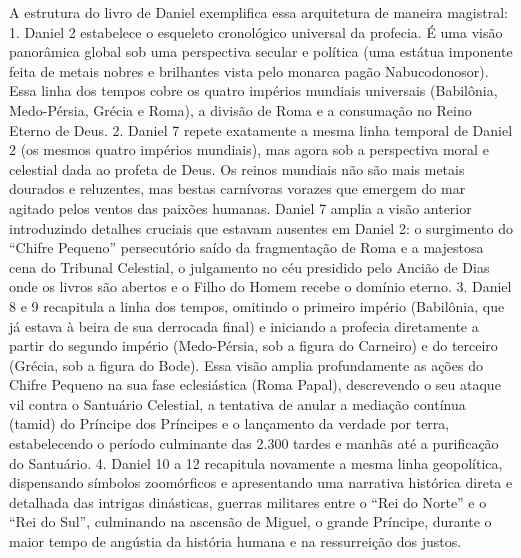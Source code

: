A estrutura do livro de Daniel exemplifica essa arquitetura de maneira magistral:
1. Daniel 2 estabelece o esqueleto cronológico universal da profecia. É uma visão panorâmica global sob uma perspectiva secular e política (uma estátua imponente feita de metais nobres e brilhantes vista pelo monarca pagão Nabucodonosor). Essa linha dos tempos cobre os quatro impérios mundiais universais (Babilônia, Medo-Pérsia, Grécia e Roma), a divisão de Roma e a consumação no Reino Eterno de Deus.
2. Daniel 7 repete exatamente a mesma linha temporal de Daniel 2 (os mesmos quatro impérios mundiais), mas agora sob a perspectiva moral e celestial dada ao profeta de Deus. Os reinos mundiais não são mais metais dourados e reluzentes, mas bestas carnívoras vorazes que emergem do mar agitado pelos ventos das paixões humanas. Daniel 7 amplia a visão anterior introduzindo detalhes cruciais que estavam ausentes em Daniel 2: o surgimento do ``Chifre Pequeno'' persecutório saído da fragmentação de Roma e a majestosa cena do Tribunal Celestial, o julgamento no céu presidido pelo Ancião de Dias onde os livros são abertos e o Filho do Homem recebe o domínio eterno.
3. Daniel 8 e 9 recapitula a linha dos tempos, omitindo o primeiro império (Babilônia, que já estava à beira de sua derrocada final) e iniciando a profecia diretamente a partir do segundo império (Medo-Pérsia, sob a figura do Carneiro) e do terceiro (Grécia, sob a figura do Bode). Essa visão amplia profundamente as ações do Chifre Pequeno na sua fase eclesiástica (Roma Papal), descrevendo o seu ataque vil contra o Santuário Celestial, a tentativa de anular a mediação contínua (tamid) do Príncipe dos Príncipes e o lançamento da verdade por terra, estabelecendo o período culminante das 2.300 tardes e manhãs até a purificação do Santuário.
4. Daniel 10 a 12 recapitula novamente a mesma linha geopolítica, dispensando símbolos zoomórficos e apresentando uma narrativa histórica direta e detalhada das intrigas dinásticas, guerras militares entre o ``Rei do Norte'' e o ``Rei do Sul'', culminando na ascensão de Miguel, o grande Príncipe, durante o maior tempo de angústia da história humana e na ressurreição dos justos.

